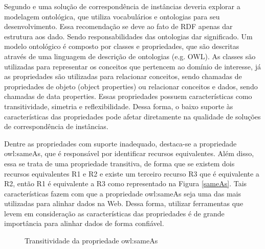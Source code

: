 Segundo \cite{homoceanu2014putting} e \cite{ferrara2008towards} uma solução de correspondência de instâncias deveria explorar a modelagem ontológica, que utiliza vocabulários e ontologias para seu desenvolvimento. Essa recomendação se deve ao fato de RDF apenas dar estrutura aos dado. Sendo responsabilidades das ontologias dar significado. Um modelo ontológico é composto por classes e propriedades, que são descritas através de uma linguagem de descrição de ontologias (e.g. OWL). As classes são utilizadas para representar os conceitos que pertencem ao domínio de interesse, já as propriedades são utilizadas para relacionar conceitos, sendo chamadas de propriedades de objeto (object properties) ou relacionar conceitos e dados, sendo chamadas de data properties. Essas propriedades possuem características como transitividade, simetria e reflexibilidade. Dessa forma, o baixo suporte às características das propriedades pode afetar diretamente na qualidade de soluções de correspondência de instâncias. 
        
Dentre as propriedades com suporte inadequado,  destaca-se a propriedade owl:sameAs, que é responsável por identificar recursos equivalentes. Além disso, essa se trata de uma propriedade transitiva, de forma que se existem dois recursos equivalentes R1 e R2 e existe um terceiro recurso R3 que é equivalente a R2, então R1 é equivalente a R3 como representado na Figura \ref{sameAs}. Tais características fazem com que a propriedade owl:sameAs seja uma das  mais utilizadas para alinhar dados na Web. Dessa forma, utilizar ferramentas que levem em consideração as características das propriedades é de grande importância para alinhar dados de forma confiável.


\begin{figure}[h]
	\centering
		\caption{Transitividade da propriedade owl:sameAs}
		\label{sameAsSample}
\end{figure}


